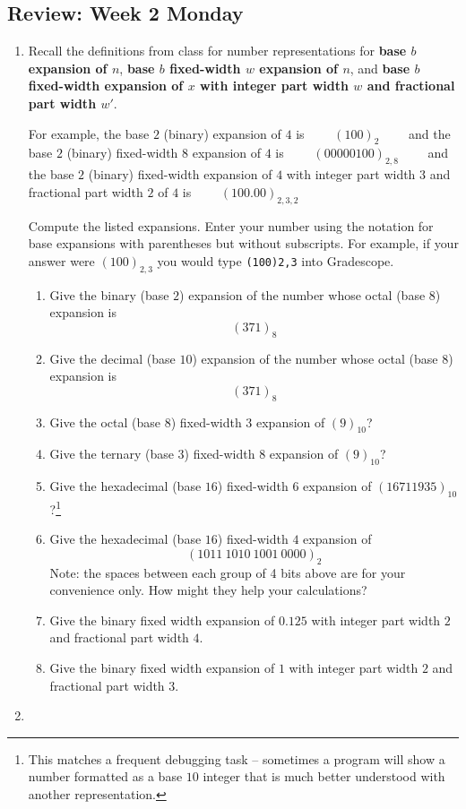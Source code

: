 \documentclass[12pt, oneside]{article}
\begin{document}
\subsection*{Review: Week 2 Monday}
\begin{enumerate}
    \item {

Recall the definitions from class for number representations for {\bf base $b$ expansion of $n$},
{\bf  base $b$ fixed-width $w$ expansion of $n$}, and {\bf base $b$ fixed-width expansion of $x$ 
with integer part width $w$ and fractional part width $w'$}.

For example, the base $2$ (binary) expansion of $4$ is 
$\qquad
(100)_2 \qquad$
and the base $2$ (binary) fixed-width $8$ expansion of $4$ is
$\qquad
(00000100)_{2,8} \qquad$
and the base $2$ (binary) fixed-width expansion of $4$ with integer part width $3$ and fractional
part width $2$ of $4$ is
$\qquad
(100.00)_{2,3,2} \qquad$

Compute the listed expansions.  Enter your number using the notation for base 
expansions with parentheses but without subscripts. For example, 
if your answer were $(100)_{2,3}$
you would type \texttt{(100)2,3} into Gradescope.

\begin{enumerate}
\item Give the binary (base $2$) expansion of the number whose octal (base $8$) expansion is
\[
(371)_8
\]
\item Give the decimal (base $10$) expansion of the number whose octal (base $8$) expansion is
\[
(371)_8
\]
\item Give the octal (base $8$) fixed-width $3$ expansion of $(9)_{10}$?
\item Give the ternary (base $3$) fixed-width $8$ expansion of $(9)_{10}$?
\item Give the hexadecimal (base $16$) fixed-width $6$ expansion of
$(16711935)_{10}$?\footnote{This matches a frequent debugging task --
sometimes a program will show a number formatted as a base $10$
integer that is much better understood with another representation.}
\item Give the hexadecimal (base $16$) fixed-width $4$ expansion of
$$(1011~ 1010 ~ 1001~ 0000 )_2$$
Note: the spaces between each group of 4 bits above are for your convenience only.  How
might they help your calculations?
\item Give the binary fixed width expansion of $0.125$ with integer part width $2$ and 
fractional part width $4$.
\item Give the binary fixed width expansion of $1$ with integer part width $2$ and 
fractional part width $3$.
\end{enumerate} }
    \item {

}
\end{enumerate}
\end{document}
